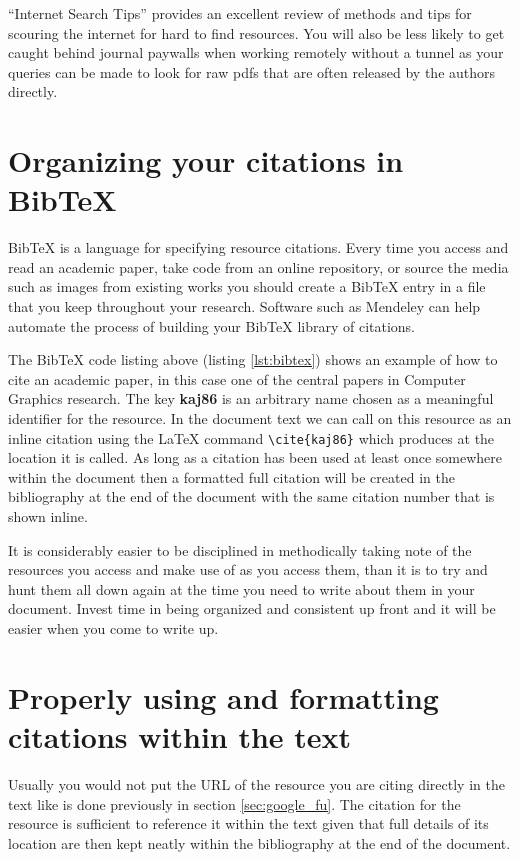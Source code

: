 		``Internet Search Tips'' \cite{gwern} provides an excellent review of methods and tips for scouring the internet for hard to find resources. You will also be less likely to get caught behind journal paywalls when working remotely without a tunnel as your queries can be made to look for raw pdfs that are often released by the authors directly.
			
	\section{Organizing your citations in BibTeX}
		\label{sec:resources_bibtex}
	
		BibTeX is a language for specifying resource citations. Every time you access and read an academic paper, take code from an online repository, or source the media such as images from existing works you should create a BibTeX entry in a file that you keep throughout your research. Software such as Mendeley \cite{mendeley} can help automate the process of building your BibTeX library of citations. 
		
		
		
		The BibTeX code listing above (listing \ref{lst:bibtex}) shows an example of how to cite an academic paper, in this case one of the central papers in Computer Graphics research. The key \textbf{kaj86} is an arbitrary name chosen as a meaningful identifier for the resource. In the document text we can call on this resource as an inline citation using the LaTeX command \lstinline|\cite{kaj86}| which produces \cite{kaj86} at the location it is called. As long as a citation has been used at least once somewhere within the document then a formatted full citation will be created in the bibliography at the end of the document with the same citation number that is shown inline.
		
		It is considerably easier to be disciplined in methodically taking note of the resources you access and make use of as you access them, than it is to try and hunt them all down again at the time you need to write about them in your document. Invest time in being organized and consistent up front and it will be easier when you come to write up.
		
	\section{Properly using and formatting citations within the text}
		Usually you would not put the URL of the resource you are citing directly in the text like is done previously in section \ref{sec:google_fu}. The citation for the resource \cite{gwern} is sufficient to reference it within the text given that full details of its location are then kept neatly within the bibliography at the end of the document. 
		
